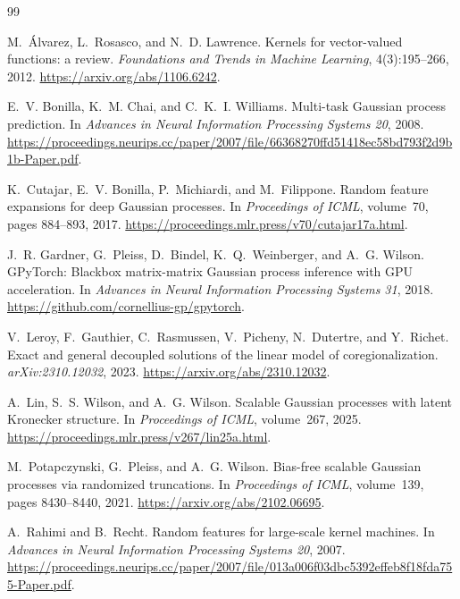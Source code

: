 \documentclass[11pt]{article}
\theoremstyle{plain}
\begin{document}
\begin{thebibliography}{99}

M.~\'Alvarez, L.~Rosasco, and N.~D. Lawrence.
\newblock Kernels for vector-valued functions: a review.
\newblock \emph{Foundations and Trends in Machine Learning}, 4(3):195--266, 2012.
\newblock \url{https://arxiv.org/abs/1106.6242}.

E.~V. Bonilla, K.~M. Chai, and C.~K.~I. Williams.
\newblock Multi-task Gaussian process prediction.
\newblock In \emph{Advances in Neural Information Processing Systems 20}, 2008.
\newblock \url{https://proceedings.neurips.cc/paper/2007/file/66368270ffd51418ec58bd793f2d9b1b-Paper.pdf}.

K.~Cutajar, E.~V. Bonilla, P.~Michiardi, and M.~Filippone.
\newblock Random feature expansions for deep Gaussian processes.
\newblock In \emph{Proceedings of ICML}, volume~70, pages 884--893, 2017.
\newblock \url{https://proceedings.mlr.press/v70/cutajar17a.html}.

J.~R. Gardner, G.~Pleiss, D.~Bindel, K.~Q.~Weinberger, and A.~G. Wilson.
\newblock GPyTorch: Blackbox matrix-matrix Gaussian process inference with GPU acceleration.
\newblock In \emph{Advances in Neural Information Processing Systems 31}, 2018.
\newblock \url{https://github.com/cornellius-gp/gpytorch}.

V.~Leroy, F.~Gauthier, C.~Rasmussen, V.~Picheny, N.~Dutertre, and Y.~Richet.
\newblock Exact and general decoupled solutions of the linear model of coregionalization.
\newblock \emph{arXiv:2310.12032}, 2023.
\newblock \url{https://arxiv.org/abs/2310.12032}.

A.~Lin, S.~S. Wilson, and A.~G. Wilson.
\newblock Scalable Gaussian processes with latent Kronecker structure.
\newblock In \emph{Proceedings of ICML}, volume~267, 2025.
\newblock \url{https://proceedings.mlr.press/v267/lin25a.html}.

M.~Potapczynski, G.~Pleiss, and A.~G. Wilson.
\newblock Bias-free scalable Gaussian processes via randomized truncations.
\newblock In \emph{Proceedings of ICML}, volume~139, pages 8430--8440, 2021.
\newblock \url{https://arxiv.org/abs/2102.06695}.

A.~Rahimi and B.~Recht.
\newblock Random features for large-scale kernel machines.
\newblock In \emph{Advances in Neural Information Processing Systems 20}, 2007.
\newblock \url{https://proceedings.neurips.cc/paper/2007/file/013a006f03dbc5392effeb8f18fda755-Paper.pdf}.


\end{thebibliography}
\end{document}
